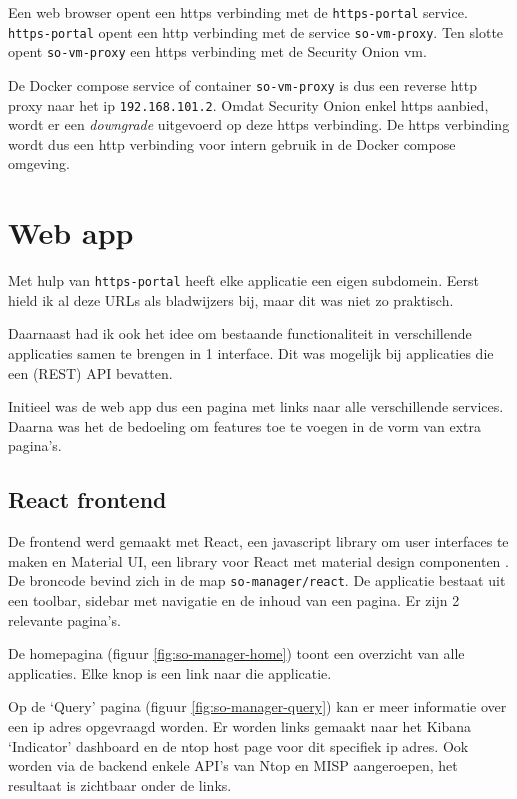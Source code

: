 \documentclass[a4paper,12pt]{report}
\begin{document}
Een web browser opent een https verbinding met de \lstinline|https-portal| service.
\lstinline|https-portal| opent een http verbinding met de service \lstinline|so-vm-proxy|.
Ten slotte opent \lstinline|so-vm-proxy| een https verbinding met de Security Onion vm.

De Docker compose service of container \lstinline|so-vm-proxy| is dus een reverse http proxy naar het ip \lstinline|192.168.101.2|.
Omdat Security Onion enkel https aanbied, wordt er een \emph{downgrade} uitgevoerd op deze https verbinding.
De https verbinding wordt dus een http verbinding voor intern gebruik in de Docker compose omgeving.

\section{Web app}
Met hulp van \lstinline|https-portal| heeft elke applicatie een eigen subdomein.
Eerst hield ik al deze URLs als bladwijzers bij, maar dit was niet zo praktisch.

Daarnaast had ik ook het idee om bestaande functionaliteit in verschillende applicaties samen te brengen in 1 interface.
Dit was mogelijk bij applicaties die een (REST) API bevatten.

Initieel was de web app dus een pagina met links naar alle verschillende services.
Daarna was het de bedoeling om features toe te voegen in de vorm van extra pagina's.

\subsection{React frontend}
\label{sec:so-manager-frontend}
De frontend werd gemaakt met React, een javascript library om user interfaces te maken \autocite{react:home} en Material UI, een library voor React met material design componenten \autocite{material-ui:home}.
De broncode bevind zich in de map \lstinline|so-manager/react|.
De applicatie bestaat uit een toolbar, sidebar met navigatie en de inhoud van een pagina.
Er zijn 2 relevante pagina's.

De homepagina (figuur \ref{fig:so-manager-home}) toont een overzicht van alle applicaties.
Elke knop is een link naar die applicatie.

Op de `Query' pagina (figuur \ref{fig:so-manager-query}) kan er meer informatie over een ip adres opgevraagd worden.
Er worden links gemaakt naar het Kibana `Indicator' dashboard en de ntop host page voor dit specifiek ip adres.
Ook worden via de backend enkele API's van Ntop en MISP aangeroepen, het resultaat is zichtbaar onder de links.
\end{document}

